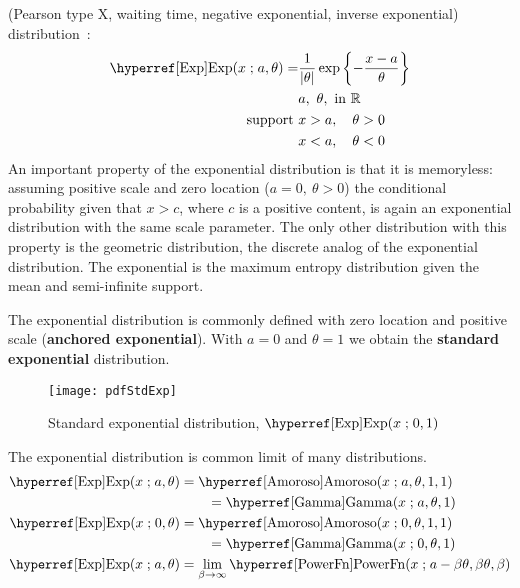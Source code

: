 

\label{sec:Exp}
 (Pearson type X, waiting time, negative exponential, inverse exponential) distribution~\cite{Pearson1916,Kondo1930,Johnson1994}:
%
\begin{align}
\label{Exp}
\opr{Exp}(x \given a, \theta) 
= & \frac{1}{|\theta|} \exp\left\{-\frac{x-a}{\theta}\right\} 	\checked
\\ \notag 
& a,\ \theta, \text{ in } \mathbb{R}  					\checked
\\ \notag
\text{support } & x > a, \quad \theta>0 				\checked
\\ \notag
& x < a, \quad \theta<0 							\checked
\end{align}
An important property of the exponential distribution is that it is memoryless: assuming positive scale and zero location ($a=0,\ \theta>0$) the conditional probability given that $x>c$, where $c$ is a positive content, is again an exponential distribution with the same scale parameter. The only other distribution with this property is the geometric distribution, the discrete analog of the exponential distribution. The exponential is the maximum entropy distribution given the mean and semi-infinite support. 





The exponential distribution is commonly defined with zero location and positive scale ({\bf anchored exponential}).
With $a=0$ and $\theta=1$ we obtain the {\bf standard exponential} distribution. 

\begin{figure}[tb]
\begin{center}
\texttt{[image: pdfStdExp]}
\end{center}
\caption[Standard exponential distribution]{Standard exponential distribution, $\opr{Exp}(x\given 0,1)$}
\end{figure}



The exponential distribution is common limit of many distributions.
\begin{align*}
	\opr{Exp} (x\given a,\theta)  
	 &	=  \opr{Amoroso}(x\given  a ,\theta,1,1) 	\checked
\\&		\qquad= \opr{Gamma}(x \given a , \theta, 1)	\checked
\\	\opr{Exp} (x\given 0,\theta)  &	=  \opr{Amoroso}(x\given  0 ,\theta,1,1) \checked
 \\ & \qquad =  \opr{Gamma}(x\given  0, \theta,1)  \checked
\\
\opr{Exp}(x\given a,\theta) &=  \lim_{\beta\rightarrow\infty} \opr{PowerFn} (x\given a-\beta\theta,\beta\theta,\beta) 
\checked
\end{align*}

